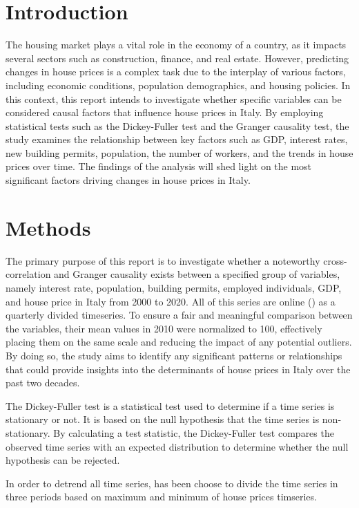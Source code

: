 \documentclass[a4paper,11pt,rmp,superscriptaddress]{report}
\begin{document}
\section*{Introduction}
The housing market plays a vital role in the economy of a country, as it impacts several sectors such as construction, 
finance, and real estate. However, predicting changes in house prices is a complex task due to the interplay of various factors, 
including economic conditions, population demographics, and housing policies. 
In this context, this report intends to investigate whether specific variables can be considered causal factors that influence house 
prices in Italy. By employing statistical tests such as the Dickey-Fuller test and the Granger causality test, the study examines 
the relationship between key factors such as GDP, interest rates, new building permits, population, the number of workers, 
and the trends in house prices over time. The findings of the analysis will shed light on the most significant factors driving changes 
in house prices in Italy.

\section*{Methods}
The primary purpose of this report is to investigate whether a noteworthy cross-correlation and Granger 
causality exists between a specified group of variables, namely interest rate, population, building permits, 
employed individuals, GDP, and house price in Italy from 2000 to 2020. All of this series are online () 
as a quarterly divided timeseries. To ensure a fair and meaningful comparison between the variables, 
their mean values in 2010 were normalized to 100, effectively placing them on the same scale and reducing the impact of any potential 
outliers. By doing so, the study aims to identify any significant patterns or relationships that could provide insights into the 
determinants of house prices in Italy over the past two decades.

The Dickey-Fuller test is a statistical test used to determine if a time series is stationary or not. 
It is based on the null hypothesis that the time series  is non-stationary. By calculating a test statistic, the Dickey-Fuller test 
compares the observed time series with an expected distribution to determine whether the null hypothesis can be rejected. 

In order to detrend all time series, has been choose to divide the time series in three periods based on maximum and minimum 
of house prices timseries.
\end{document}
